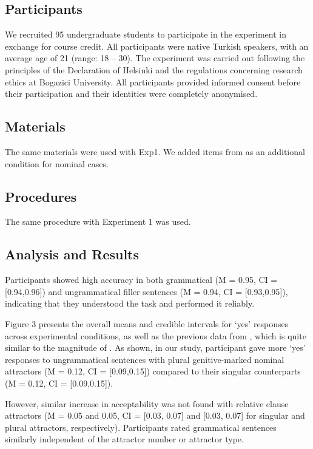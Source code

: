 \documentclass[
  authoryear,
  3p]{elsarticle}
\begin{document}
\subsection{Participants}\label{participants-1}

We recruited 95 undergraduate students to participate in the experiment
in exchange for course credit. All participants were native Turkish
speakers, with an average age of 21 (range: 18 -- 30). The experiment
was carried out following the principles of the Declaration of Helsinki
and the regulations concerning research ethics at Bogazici University.
All participants provided informed consent before their participation
and their identities were completely anonymised.

\subsection{Materials}\label{materials-1}

The same materials were used with Exp1. We added items from
\citet{TurkLogacev2024} as an additional condition for nominal cases.

\subsection{Procedures}\label{procedures-1}

The same procedure with Experiment 1 was used.

\subsection{Analysis and Results}\label{analysis-and-results-1}

Participants showed high accuracy in both grammatical (M = 0.95, CI =
{[}0.94,0.96{]}) and ungrammatical filler sentences (M = 0.94, CI =
{[}0.93,0.95{]}), indicating that they understood the task and performed
it reliably.

Figure 3 presents the overall means and credible intervals for `yes'
responses across experimental conditions, as well as the previous data
from \citet{TurkLogacev2024}, which is quite similar to the magnitude of
\citet{LagoEtAl2019}. As shown, in our study, participant gave more
`yes' responses to ungrammatical sentences with plural genitive-marked
nominal attractors (M = 0.12, CI = {[}0.09,0.15{]}) compared to their
singular counterparts (M = 0.12, CI = {[}0.09,0.15{]}).

However, similar increase in acceptability was not found with relative
clause attractors (M = 0.05 and 0.05, CI = {[}0.03, 0.07{]} and {[}0.03,
0.07{]} for singular and plural attractors, respectively). Participants
rated grammatical sentences similarly independent of the attractor
number or attractor type.
\end{document}
